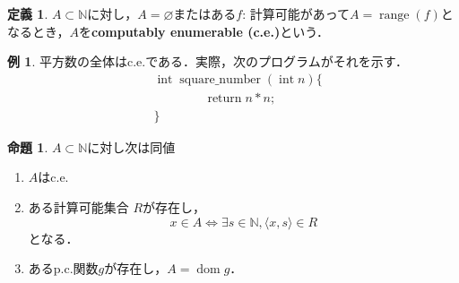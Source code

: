 \documentclass[uplatex]{jsarticle}
\newcommand{\N}{\mathbb{N}}
\newcommand{\range}{\operatorname{range}}
\newcommand{\dom}{\operatorname{dom}}
\theoremstyle{definition} %
\newtheorem{defi}[thm]{定義}
\newtheorem{prop}[thm]{命題}
\newtheorem{exm}[thm]{例}
\begin{document}
\begin{defi}
$A \subset \N$に対し，$A = \varnothing$またはある$f$: 計算可能があって$A = \range(f)$となるとき，$A$を{\bfseries computably enumerable (c.e.)}という．
\end{defi}

\begin{exm}
平方数の全体はc.e.である．実際，次のプログラムがそれを示す．
\begin{align*}
&\operatorname{int} \operatorname{square\_number}(\operatorname{int} n) \{ \\
&\hspace{4em}\operatorname{return} n * n; \\
&\}
\end{align*}
\end{exm}

\begin{prop}
$A \subset \N$に対し次は同値


\begin{enumerate}
\item $A$はc.e.
\item ある計算可能集合 $R$が存在し，
\[x \in A \iff \exists s \in \N, \langle x, s\rangle \in R \]
となる．
\item あるp.c.関数$g$が存在し，$A = \dom g$．
\end{enumerate}
\end{prop}
\end{document}
